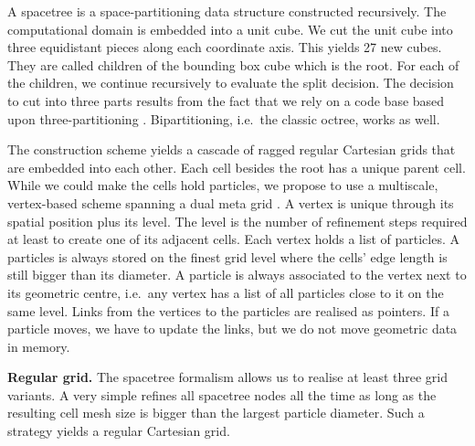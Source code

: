 A spacetree is a space-partitioning data structure constructed recursively.
The computational domain is embedded into a unit cube.
We cut the unit cube into three equidistant pieces along each coordinate axis. 
This yields 27 new cubes. 
They are called children of the bounding box cube which is the root.
For each of the children, we continue recursively to evaluate the split
decision. 
The decision to cut into three parts results from the fact that we rely on a
code base based upon three-partitioning \cite{Software:Peano}.
Bipartitioning, i.e.~the classic octree, works as well.


The construction scheme yields a cascade of ragged regular Cartesian grids that
are embedded into each other.
Each cell besides the root has a unique parent cell.
While we could make the cells hold particles, we propose to use a
multiscale, vertex-based scheme spanning a dual meta grid
\cite{Weinzierl:16:PIC}.
A vertex is unique through its spatial position plus its level. 
The level is the number of refinement steps required at least to create one of
its adjacent cells.
Each vertex holds a list of particles.
A particles is always stored on the finest grid level where the cells' edge
length is still bigger than its diameter.
A particle is always associated to the vertex next to its geometric centre,
i.e.~any vertex has a list of all particles close to it on the same level.
Links from the vertices to the particles are realised as pointers. 
If a particle moves, we have to update the links, but we do not move
geometric data in memory.






{\bf Regular grid.}
The spacetree formalism allows us to realise at least three grid variants. 
A very simple refines all spacetree nodes all the time as long as the resulting
cell mesh size is bigger than the largest particle diameter.
Such a strategy yields a regular Cartesian grid. 


